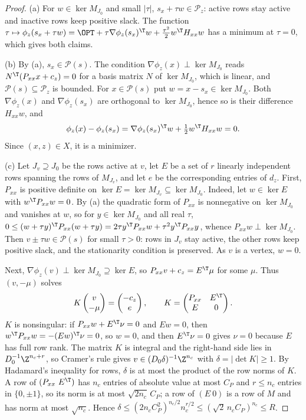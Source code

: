 \begin{proof}
(a) For $w\in\ker M_{J_0}$ and small $\lvert\tau\rvert$, $s_x+\tau w\in\mathcal P_z$:
active rows stay active and inactive rows keep positive slack. The function
$\tau\mapsto\phi_z(s_x+\tau w)=\OPT+\tau\nabla\phi_z(s_x)^{\T}w+\frac{\tau^2}{2}w^{\T}H_{xx}w$
has a minimum at $\tau=0$, which gives both claims.

(b) By (a), $s_x\in\mathcal P(s)$. The condition
$\nabla\phi_z(x)\perp\ker M_{J_0}$ reads $N^{\T}(P_{xx}x+c_z)=0$ for a basis
matrix $N$ of $\ker M_{J_0}$, which is linear, and $\mathcal P(s)\subseteq\mathcal P_z$
is bounded. For $x\in\mathcal P(s)$ put $w=x-s_x\in\ker M_{J_0}$. Both
$\nabla\phi_z(x)$ and $\nabla\phi_z(s_x)$ are orthogonal to $\ker M_{J_0}$, hence so
is their difference $H_{xx}w$, and
\[
\phi_z(x)-\phi_z(s_x)=\nabla\phi_z(s_x)^{\T}w+\tfrac12w^{\T}H_{xx}w=0 .
\]
Since $(x,z)\in X$, it is a minimizer.

(c) Let $J_v\supseteq J_0$ be the rows active at $v$, let $E$ be a set of
$r$ linearly independent rows spanning the rows of $M_{J_v}$, and let $e$ be
the corresponding entries of $d_z$. First, $P_{xx}$ is positive definite on
$\ker E=\ker M_{J_v}\subseteq\ker M_{J_0}$. Indeed, let $w\in\ker E$ with
$w^{\T}P_{xx}w=0$. By (a) the quadratic form of $P_{xx}$ is nonnegative on
$\ker M_{J_0}$ and vanishes at $w$, so for $y\in\ker M_{J_0}$ and all real
$\tau$, $0\le(w+\tau y)^{\T}P_{xx}(w+\tau y)=2\tau y^{\T}P_{xx}w+\tau^2y^{\T}P_{xx}y$,
whence $P_{xx}w\perp\ker M_{J_0}$. Then $v\pm\tau w\in\mathcal P(s)$ for small
$\tau>0$: rows in $J_v$ stay active, the other rows keep positive slack, and
the stationarity condition is preserved. As $v$ is a vertex, $w=0$.

Next, $\nabla\phi_z(v)\perp\ker M_{J_0}\supseteq\ker E$, so
$P_{xx}v+c_z=E^{\T}\mu$ for some $\mu$. Thus $(v,-\mu)$ solves
\[
K\begin{pmatrix}v\\ -\mu\end{pmatrix}=\begin{pmatrix}-c_z\\ e\end{pmatrix},\qquad
K=\begin{pmatrix}P_{xx}&E^{\T}\\ E&0\end{pmatrix}.
\]
$K$ is nonsingular: if $P_{xx}w+E^{\T}\nu=0$ and $Ew=0$, then
$w^{\T}P_{xx}w=-(Ew)^{\T}\nu=0$, so $w=0$, and then $E^{\T}\nu=0$ gives $\nu=0$
because $E$ has full row rank. The matrix $K$ is integral and the right-hand
side lies in $D_0^{-1}\Z^{n_c+r}$, so Cramer's rule gives
$v\in(D_0\delta)^{-1}\Z^{n_c}$ with $\delta=\lvert\det K\rvert\ge1$. By Hadamard's
inequality for rows, $\delta$ is at most the product of the row norms of $K$.
A row of $(P_{xx}\ E^{\T})$ has $n_c$ entries of absolute value at most $C_P$
and $r\le n_c$ entries in $\{0,\pm1\}$, so its norm is at most
$\sqrt{2n_c}\,C_P$; a row of $(E\ 0)$ is a row of $M$ and has norm at most
$\sqrt{n_c}$. Hence
$\delta\le(2n_cC_P^2)^{n_c/2}n_c^{r/2}\le(\sqrt2\,n_cC_P)^{n_c}\le R$.
\end{proof}

